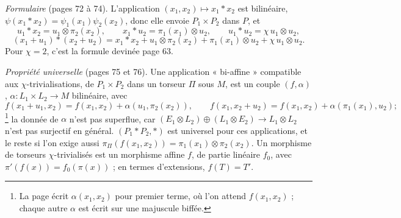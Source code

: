 \documentclass[11pt,a4paper]{article}
\begin{document}
\emph{Formulaire} (pages 72 à 74). L'application $(x_1, x_2) \mapsto x_1 * x_2$ est
bilinéaire, $\psi(x_1 * x_2) = \psi_1(x_1)\psi_2(x_2)$, donc elle envoie $P_1 \times P_2$
dans $P$, et
\[
  u_1 * x_2 = u_1 \otimes \pi_2(x_2), \qquad x_1 * u_2 = \pi_1(x_1) \otimes u_2, \qquad
  u_1 * u_2 = \chi\, u_1 \otimes u_2,
\]
\[
  (x_1 + u_1) * (x_2 + u_2) = x_1 * x_2 + u_1 \otimes \pi_2(x_2) + \pi_1(x_1) \otimes u_2 + \chi\, u_1 \otimes u_2 .
\]
Pour $\chi = 2$, c'est la formule devinée page 63.

\emph{Propriété universelle} (pages 75 et 76). Une application « bi-affine »
compatible aux $\chi$-trivialisations, de $P_1 \times P_2$ dans un torseur $\Pi$ sous
$M$, est un couple $(f, \alpha)$, $\alpha : L_1 \times L_2 \to M$ bilinéaire, avec
\[
  f(x_1 + u_1, x_2) = f(x_1, x_2) + \alpha(u_1, \pi_2(x_2)), \qquad
  f(x_1, x_2 + u_2) = f(x_1, x_2) + \alpha(\pi_1(x_1), u_2) ;
\]\footnote{La page écrit
  $\alpha(x_1, x_2)$ pour premier terme, où l'on attend $f(x_1, x_2)$ ; chaque autre
  $\alpha$ est écrit sur une majuscule biffée.}
la donnée de $\alpha$ n'est pas superflue, car $(E_1 \otimes L_2) \oplus (L_1 \otimes E_2)
\to L_1 \otimes L_2$ n'est pas surjectif en général. $(P_1 * P_2, *)$ est universel
pour ces applications, et le reste si l'on exige aussi $\pi_\Pi(f(x_1, x_2)) =
\pi_1(x_1) \otimes \pi_2(x_2)$. Un morphisme de torseurs $\chi$-trivialisés est un
morphisme affine $f$, de partie linéaire $f_0$, avec $\pi'(f(x)) = f_0(\pi(x))$ ;
en termes d'extensions, $f(T) = T'$.
\end{document}
